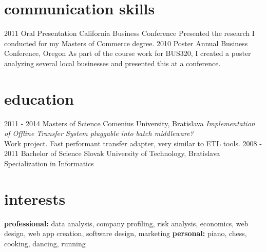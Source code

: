 \documentclass[]{friggeri-cv} %
\begin{document}

\section{communication skills}

\begin{entrylist}
\entry
{2011}
{Oral Presentation}
{California Business Conference}
{Presented the research I conducted for my Masters of Commerce degree.}
\entry
{2010}
{Poster}
{Annual Business Conference, Oregon}
{As part of the course work for BUS320, I created a poster analyzing several local businesses and presented this at a conference.}
\end{entrylist}


\section{education}

\begin{entrylist}
\entry
{2011 - 2014}
{Masters {\normalfont of Science}}
{Comenius University, Bratislava}
{\emph{Implementation of Offline Transfer System pluggable into batch middleware?} \\ Work project. Fast performant transfer adapter, very similar to ETL tools.}
\entry
{2008 - 2011}
{Bachelor {\normalfont of Science}}
{Slovak University of Technology, Bratislava}
{Specialization in Informatics}
\end{entrylist}



\section{interests}

\textbf{professional:} data analysis, company profiling, risk analysis, economics, web design, web app creation, software design, marketing \textbf{personal:} piano, chess, cooking, dancing, running

\end{document}
